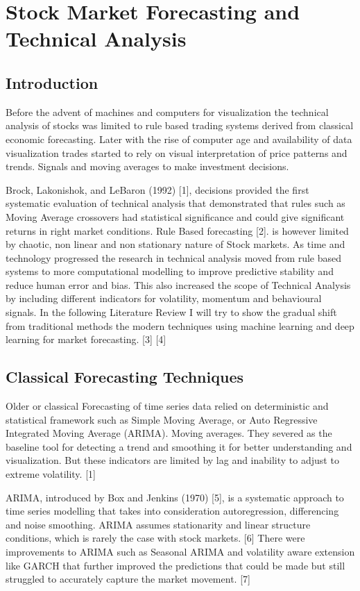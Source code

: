 \section{Stock Market Forecasting and Technical Analysis}

\subsection{Introduction}

Before the advent of machines and computers for visualization the technical analysis of stocks was limited to rule based trading systems derived from classical economic forecasting. Later with the rise of computer age and availability of data visualization trades started to rely on visual interpretation of price patterns and trends.  Signals and moving averages to make investment decisions.

Brock, Lakonishok, and LeBaron (1992) [1], decisions provided the first systematic evaluation of technical analysis that demonstrated that rules such as Moving Average crossovers had statistical significance and could give significant returns in right market conditions. Rule Based forecasting [2]. is however limited by chaotic, non linear and non stationary nature of Stock markets. As time and technology progressed the research in technical analysis moved from rule based systems to more computational modelling to improve predictive stability and reduce human error and bias. This also increased the scope of Technical Analysis by including different indicators for volatility, momentum and behavioural signals. In the following Literature Review I will try to show the gradual shift from traditional methods the modern techniques using machine learning and deep learning for market forecasting. [3] [4]

\subsection{Classical Forecasting Techniques}

Older or classical Forecasting of time series data relied on deterministic and statistical framework such as Simple Moving Average, or Auto Regressive Integrated Moving Average (ARIMA). Moving averages. They severed as the baseline tool for detecting a trend and smoothing it for better understanding and visualization. But these indicators are limited by lag and inability to adjust to extreme volatility. [1]

ARIMA, introduced by Box and Jenkins (1970) [5], is a systematic approach to time series modelling that takes into consideration autoregression, differencing and noise smoothing. ARIMA assumes stationarity and linear structure conditions, which is rarely the case with stock markets. [6] There were improvements to ARIMA such as Seasonal ARIMA and volatility aware extension like GARCH that further improved the predictions that could be made but still struggled to accurately capture the market movement. [7]

